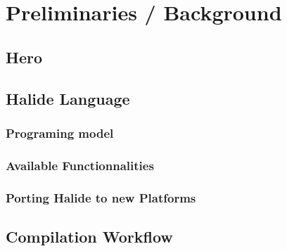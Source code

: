 
\chapter{Preliminaries / Background}
\section{Hero}

\section{Halide Language}
	\subsection { Programing model}

	\subsection { Available Functionnalities}

	\subsection { Porting Halide to new Platforms}

\section{Compilation Workflow}

